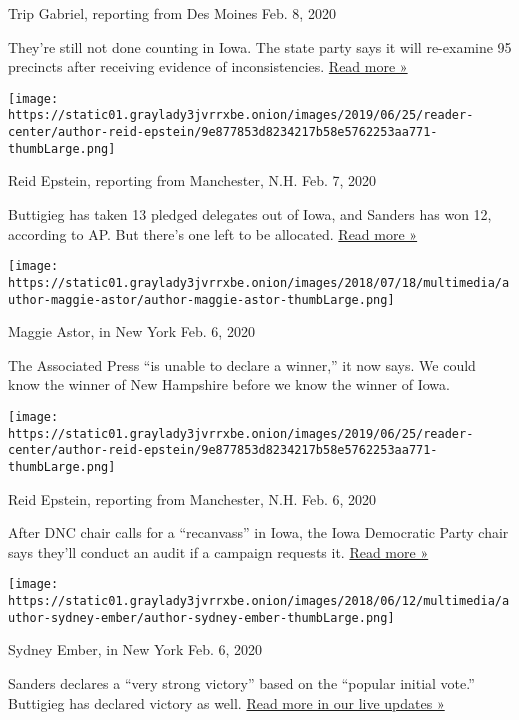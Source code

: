 Trip Gabriel, reporting from Des Moines Feb. 8, 2020

They're still not done counting in Iowa. The state party says it will
re-examine 95 precincts after receiving evidence of inconsistencies.
\href{https://www.nytimes3xbfgragh.onion/live/2020/new-hampshire-primary-02-08?action=click\&module=ELEX_results\&pgtype=Interactive\&region=ReporterUpdates\#iowa-caucuses-95-precincts}{Read
more »}

\texttt{[image: https://static01.graylady3jvrrxbe.onion/images/2019/06/25/reader-center/author-reid-epstein/9e877853d8234217b58e5762253aa771-thumbLarge.png]}

Reid Epstein, reporting from Manchester, N.H. Feb. 7, 2020

Buttigieg has taken 13 pledged delegates out of Iowa, and Sanders has
won 12, according to AP. But there's one left to be allocated.
\href{https://www.nytimes3xbfgragh.onion/2020/02/07/us/politics/iowa-pledged-delegates.html?action=click\&module=ELEX_results\&pgtype=Interactive\&region=ReporterUpdates}{Read
more »}

\texttt{[image: https://static01.graylady3jvrrxbe.onion/images/2018/07/18/multimedia/author-maggie-astor/author-maggie-astor-thumbLarge.png]}

Maggie Astor, in New York Feb. 6, 2020

The Associated Press ``is unable to declare a winner,'' it now says. We
could know the winner of New Hampshire before we know the winner of
Iowa.

\texttt{[image: https://static01.graylady3jvrrxbe.onion/images/2019/06/25/reader-center/author-reid-epstein/9e877853d8234217b58e5762253aa771-thumbLarge.png]}

Reid Epstein, reporting from Manchester, N.H. Feb. 6, 2020

After DNC chair calls for a ``recanvass'' in Iowa, the Iowa Democratic
Party chair says they'll conduct an audit if a campaign requests it.
\href{https://www.nytimes3xbfgragh.onion/live/2020/iowa-caucus-nh-primary-02-06?action=click\&module=ELEX_results\&pgtype=Interactive\&region=ReporterUpdates\#troy-price}{Read
more »}

\texttt{[image: https://static01.graylady3jvrrxbe.onion/images/2018/06/12/multimedia/author-sydney-ember/author-sydney-ember-thumbLarge.png]}

Sydney Ember, in New York Feb. 6, 2020

Sanders declares a ``very strong victory'' based on the ``popular
initial vote.'' Buttigieg has declared victory as well.
\href{https://www.nytimes3xbfgragh.onion/live/2020/iowa-caucus-nh-primary-02-06?action=click\&module=ELEX_results\&pgtype=Interactive\&region=ReporterUpdates\#sanders-declares-victory-in-iowa-caucuses}{Read
more in our live updates »}


